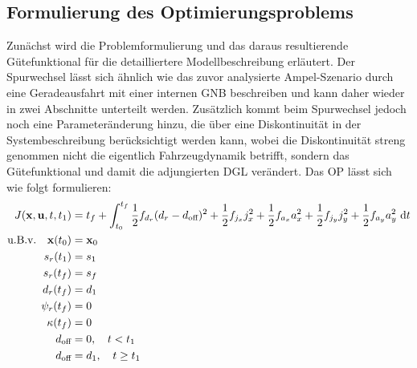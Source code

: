 \subsection{Formulierung des Optimierungsproblems}\label{subsec:Gütefunktional_Spurwechsel}
Zunächst wird die Problemformulierung und das daraus resultierende Gütefunktional für die detailliertere Modellbeschreibung erläutert. Der Spurwechsel lässt sich ähnlich wie das zuvor analysierte Ampel-Szenario durch eine Geradeausfahrt mit einer internen \gls{GNB} beschreiben und kann daher wieder in zwei Abschnitte unterteilt werden. Zusätzlich kommt beim Spurwechsel jedoch noch eine Parameteränderung hinzu, die über eine Diskontinuität in der Systembeschreibung berücksichtigt werden kann, wobei die Diskontinuität streng genommen nicht die eigentlich Fahrzeugdynamik betrifft, sondern das Gütefunktional und damit die adjungierten \gls{DGL} verändert. Das \gls{OP} lässt sich wie folgt formulieren:
\begin{align}
J(\boldsymbol{\mathrm{x}},\boldsymbol{\mathrm{u}},t,t_1) &= t_f + \int_{t_0}^{t_f}\frac{1}{2}f_{d_r}(d_r - d_{\textrm{off}})^2 + \frac{1}{2}f_{j_x} j_x^2 + \frac{1}{2}f_{a_x} a_x^2 + \frac{1}{2}f_{j_y} j_y^2 + \frac{1}{2}f_{a_y} a_y^2~\textrm{d}{t} \\
\textrm{u.B.v.} \quad \boldsymbol{\mathrm{x}}(t_0) &= \boldsymbol{\mathrm{x}}_0 \\
s_r(t_1) &= s_1 \\
s_r(t_f) &= s_f \\
d_r(t_f) &= d_1 \label{eq:Spurwechsel_Endbedingung_dr}\\
\psi_r(t_f) &= 0 \label{eq:Spurwechsel_Endbedingung_psir}\\
\kappa(t_f) &= 0 \label{eq:Spurwechsel_Endbedingung_kappa}\\
d_{\textrm{off}} &= 0,\quad t<t_1 \label{eq:Spurwechsel_interneGNB_dr_zero}\\
d_{\textrm{off}} &= d_1,\quad t\geq t_1 \label{eq:Spurwechsel_interneGNB_dr_d1}
\end{align}

